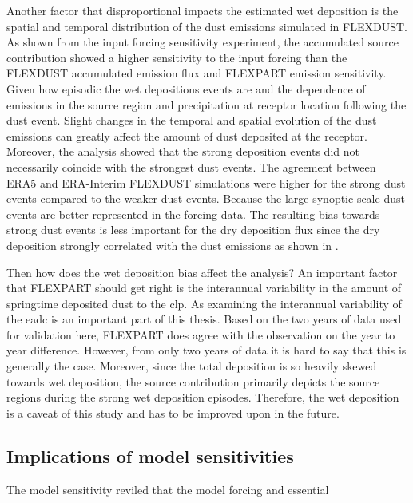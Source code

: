 Another factor that disproportional impacts the estimated wet deposition is the spatial and temporal distribution of the dust emissions simulated in FLEXDUST. 
As shown from the input forcing sensitivity experiment, the accumulated source contribution showed a higher sensitivity to the input forcing than the FLEXDUST accumulated emission flux and FLEXPART emission sensitivity. Given how episodic the wet depositions events are and the dependence of emissions in the source region and precipitation at receptor location following the dust event. Slight changes in the temporal and spatial evolution of the dust emissions can greatly affect the amount of dust deposited at the receptor. Moreover, the analysis showed that the strong deposition events did not necessarily coincide with the strongest dust events. The agreement between ERA5 and ERA-Interim FLEXDUST simulations were higher for the strong dust events compared to the weaker dust events. Because the large synoptic scale dust events are better represented in the forcing data. The resulting bias towards strong dust events is less important for the dry deposition flux since the dry deposition strongly correlated with the dust emissions as shown in . 

Then how does the wet deposition bias affect the analysis?
An important factor that FLEXPART should get right is the interannual variability in the amount of springtime deposited dust to the \acrshort{clp}. 
As examining the interannual variability of the \acrshort{eadc} is an important part of this thesis. 
Based on the two years of data used for validation here, FLEXPART does agree with the observation on the year to year difference. 
However, from only two years of data it is hard to say that this is generally the case.
Moreover, since the total deposition is so heavily skewed towards wet deposition, the source contribution primarily depicts the source regions during the strong wet deposition episodes.  
Therefore, the wet deposition is a caveat of this study and has to be improved upon in the future. 

\subsection{Implications of model sensitivities}\label{sec:sensitivity_experiments_implications}
The model sensitivity reviled that the model forcing and  essential 

